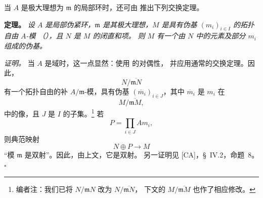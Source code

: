 当 \(A\) 是极大理想为 \(\mathfrak m\) 的局部环时，还可由
 推出下列交换定理。

\medskip
\noindent\textbf{定理。}
\label{sga3:VIIB:0.3.4.exchange}
\textit{设 \(A\) 是局部伪紧环，\(\mathfrak m\) 是其极大理想，\(M\) 是具有伪基
\((m_i)_{i\in I}\) 的拓扑自由 \(A\)-模
\textup{（）}，且 \(N\) 是 \(M\) 的闭直和项。
则 \(M\) 有一个由 \(N\) 中的元素及部分 \(m_i\) 组成的伪基。}

\noindent\textit{证明。}
当 \(A\) 是域时，这一点显然：使用  的对偶性，
并应用通常的交换定理。因此，
\[
  N/\overline{\mathfrak mN}
\]
有一个拓扑自由的补 \(A/\mathfrak m\)-模，具有伪基
\((\overline{m}_i)_{i\in J}\)，其中 \(\overline{m}_i\) 是 \(m_i\) 在
\[
  M/\overline{\mathfrak mM},
\]
中的像，且 \(J\) 是 \(I\) 的子集。\footnote{编者注：我们已将 \(N/\mathfrak mN\) 改为 \(N/\overline{\mathfrak mN}\)，
下文的 \(M/\overline{\mathfrak mM}\) 也作了相应修改。}
若
\[
  P=\prod_{i\in J}Am_i,
\]
则典范映射
\[
  N\oplus P\longrightarrow M
\]
“模 \(\mathfrak m\) 是双射”。因此，由上文，它是双射。
另一证明见 \textup{[CA]}，\S~IV.2，命题~8。
\hfill\(\square\)


